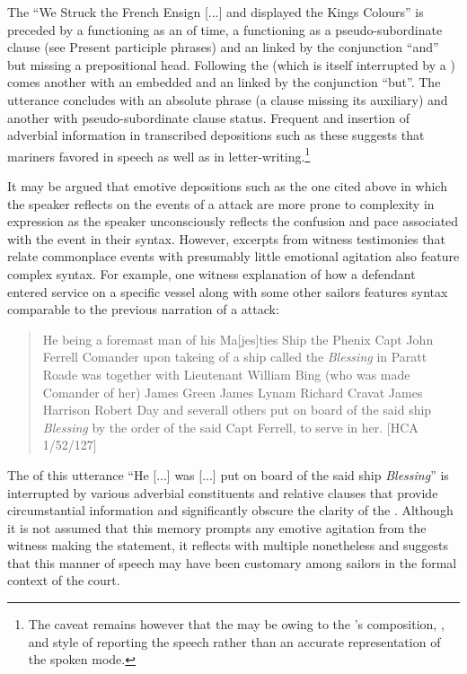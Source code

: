 The  “We Struck the French Ensign [...] and displayed the Kings Colours” is preceded by a  functioning as an  of time, a  functioning as a pseudo-subordinate clause (see  Present participle phrases) and an  linked by the conjunction “and” but missing a prepositional head. Following the  (which is itself interrupted by a ) comes another  with an embedded  and an  linked by the conjunction “but”. The utterance concludes with an absolute phrase (a clause missing its auxiliary) and another  with pseudo-subordinate clause status. Frequent  and insertion of adverbial information in transcribed depositions such as these suggests that mariners favored  in speech as well as in letter-writing.\footnote{The caveat remains however that the  may be owing to the ’s composition, , and style of reporting the speech rather than an accurate representation of the spoken mode.} 

It may be argued that emotive depositions such as the one cited above in which the speaker reflects on the events of a  attack are more prone to complexity in expression as the speaker unconsciously reflects the confusion and pace associated with the event in their syntax. However, excerpts from witness testimonies that relate commonplace events with presumably little emotional agitation also feature complex syntax. For example, one witness explanation of how a defendant entered service on a specific vessel along with some other sailors features syntax comparable to the previous narration of a  attack:

\begin{quotation}
He being a foremast man of his Ma[jes]ties Ship the Phenix Capt John Ferrell Comander upon takeing of a ship called the \textit{Blessing} in Paratt Roade was together with Lieutenant William Bing (who was made Comander of her) James Green James Lynam Richard Cravat James Harrison Robert Day and severall others put on board of the said ship \textit{Blessing} by the order of the said Capt Ferrell, to serve in her. [HCA 1/52/127]
\end{quotation}

The  of this utterance “He [...] was [...] put on board of the said ship \textit{Blessing}” is interrupted by various adverbial constituents and relative clauses that provide circumstantial information and significantly obscure the clarity of the . Although it is not assumed that this memory prompts any emotive agitation from the witness making the statement, it reflects  with multiple  nonetheless and suggests that this manner of speech may have been customary among sailors in the formal context of the court. 

